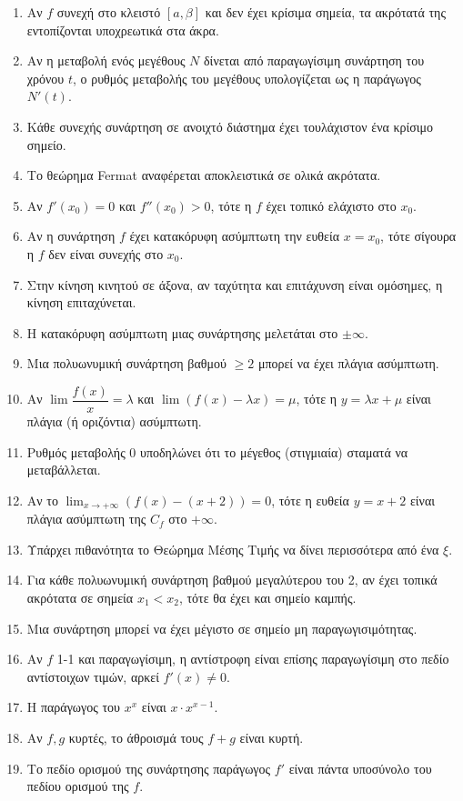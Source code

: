 \documentclass[11pt,a4paper]{article}
\newcommand{\eng}[1]{\selectlanguage{english}#1\selectlanguage{greek}}
\begin{document}
\begin{enumerate}[label=\textbf{2.\arabic*.}]
    \item Αν $f$ συνεχή στο κλειστό $[a, \beta]$ και δεν έχει κρίσιμα σημεία, τα ακρότατά της εντοπίζονται υποχρεωτικά στα άκρα.
    \item Αν η μεταβολή ενός μεγέθους $N$ δίνεται από παραγωγίσιμη συνάρτηση του χρόνου $t$, ο ρυθμός μεταβολής του μεγέθους υπολογίζεται ως η παράγωγος $N'(t)$.
    \item Κάθε συνεχής συνάρτηση σε ανοιχτό διάστημα έχει τουλάχιστον ένα κρίσιμο σημείο.
    \item Το θεώρημα \eng{\eng{Fermat}} αναφέρεται αποκλειστικά σε ολικά ακρότατα.
    \item Αν $f'(x_0) = 0$ και $f''(x_0) > 0$, τότε η $f$ έχει τοπικό ελάχιστο στο $x_0$.
    \item Αν η συνάρτηση $f$ έχει κατακόρυφη ασύμπτωτη την ευθεία $x = x_0$, τότε σίγουρα η $f$ δεν είναι συνεχής στο $x_0$.
    \item Στην κίνηση κινητού σε άξονα, αν ταχύτητα και επιτάχυνση είναι ομόσημες, η κίνηση επιταχύνεται.
    \item Η κατακόρυφη ασύμπτωτη μιας συνάρτησης μελετάται στο $\pm \infty$.
    \item Μια πολυωνυμική συνάρτηση βαθμού $\ge 2$ μπορεί να έχει πλάγια ασύμπτωτη.
    \item Αν $\lim \dfrac{f(x)}{x} = \lambda$ και $\lim (f(x)-\lambda x) = \mu$, τότε η $y=\lambda x + \mu$ είναι πλάγια (ή οριζόντια) ασύμπτωτη.
    \item Ρυθμός μεταβολής 0 υποδηλώνει ότι το μέγεθος (στιγμιαία) σταματά να μεταβάλλεται.
    \item Αν το $\lim_{x\to +\infty} (f(x) - (x+2)) = 0$, τότε η ευθεία $y = x+2$ είναι πλάγια ασύμπτωτη της $C_f$ στο $+\infty$.
    \item Υπάρχει πιθανότητα το Θεώρημα Μέσης Τιμής να δίνει περισσότερα από ένα $\xi$.
    \item Για κάθε πολυωνυμική συνάρτηση βαθμού μεγαλύτερου του 2, αν έχει τοπικά ακρότατα σε σημεία $x_1<x_2$, τότε θα έχει και σημείο καμπής.
    \item Μια συνάρτηση μπορεί να έχει μέγιστο σε σημείο μη παραγωγισιμότητας.
    \item Αν $f$ 1-1 και παραγωγίσιμη, η αντίστροφη είναι επίσης παραγωγίσιμη στο πεδίο αντίστοιχων τιμών, αρκεί $f'(x) \ne 0$.
    \item Η παράγωγος του $x^x$ είναι $x \cdot x^{x-1}$.
    \item Αν $f, g$ κυρτές, το άθροισμά τους $f+g$ είναι κυρτή.
    \item Το πεδίο ορισμού της συνάρτησης παράγωγος $f'$ είναι πάντα υποσύνολο του πεδίου ορισμού της $f$.

\end{enumerate}
\end{document}
